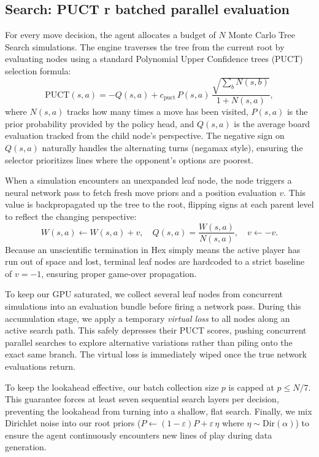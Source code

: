 \documentclass[conference]{IEEEtran}
\begin{document}
\subsection{Search: PUCT r batched parallel evaluation}
For every move decision, the agent allocates a budget of $N$ Monte Carlo Tree Search simulations. The engine traverses the tree from the current root by evaluating nodes using a standard Polynomial Upper Confidence trees (PUCT) selection formula:
\begin{equation}
  \mathrm{PUCT}(s,a) = -Q(s,a) + c_{\text{puct}}\, P(s,a)\, \frac{\sqrt{\sum_b N(s,b)}}{1+N(s,a)},
  \label{eq:puct}
\end{equation}
where $N(s,a)$ tracks how many times a move has been visited, $P(s,a)$ is the prior probability provided by the policy head, and $Q(s,a)$ is the average board evaluation tracked from the child node's perspective. The negative sign on $Q(s,a)$ naturally handles the alternating turns (negamax style), ensuring the selector prioritizes lines where the opponent's options are poorest.

When a simulation encounters an unexpanded leaf node, the node triggers a neural network pass to fetch fresh move priors and a position evaluation $v$. This value is backpropagated up the tree to the root, flipping signs at each parent level to reflect the changing perspective:
\begin{equation}
  W(s,a) \leftarrow W(s,a) + v, \quad Q(s,a) = \frac{W(s,a)}{N(s,a)}, \quad v \leftarrow -v.
  \label{eq:backup}
\end{equation}
Because an unscientific termination in Hex simply means the active player has run out of space and lost, terminal leaf nodes are hardcoded to a strict baseline of $v=-1$, ensuring proper game-over propagation.

To keep our GPU saturated, we collect several leaf nodes from concurrent simulations into an evaluation bundle before firing a network pass. During this accumulation stage, we apply a temporary \emph{virtual loss} \cite{chaslot2008parallel} to all nodes along an active search path. This safely depresses their PUCT scores, pushing concurrent parallel searches to explore alternative variations rather than piling onto the exact same branch. The virtual loss is immediately wiped once the true network evaluations return.

To keep the lookahead effective, our batch collection size $p$ is capped at $p \le N/7$. This guarantee forces at least seven sequential search layers per decision, preventing the lookahead from turning into a shallow, flat search. Finally, we mix Dirichlet noise into our root priors ($P \leftarrow (1-\varepsilon)P + \varepsilon\,\eta$ where $\eta\sim\mathrm{Dir}(\alpha)$) to ensure the agent continuously encounters new lines of play during data generation.
\end{document}
